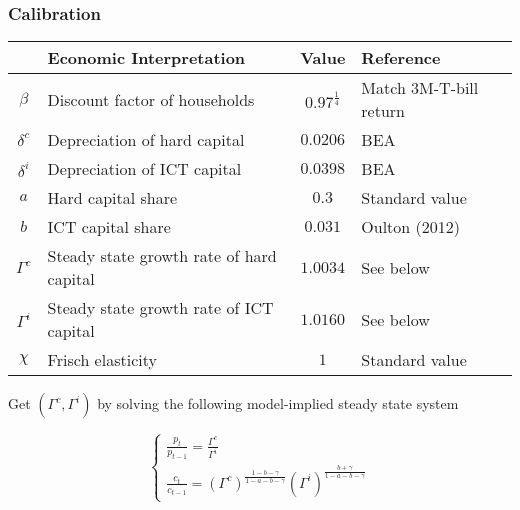 \documentclass{beamer}
\begin{document}
\begin{frame}
	\frametitle{Calibration}
	\label{calibration}

\begin{table}[h!]
\footnotesize
	\begin{center}
		\begin{tabular}{clcl}
			\hline
			 & Economic Interpretation &  Value & Reference\\
			\hline
            $\beta$ & Discount factor of households &   $0.97^{\frac{1}{4}}$ & Match 3M-T-bill return \\
            $\delta^c$     & Depreciation of hard capital & $0.0206$  & BEA\\
            $\delta^i$           & Depreciation of ICT capital &  $0.0398$ & BEA \\
            $a$           & Hard capital share & $0.3$  & Standard value\ \\
            $b$           & ICT capital share &  $0.031$ & Oulton (2012) \\
            $\Gamma^c$           & Steady state growth rate of hard capital &  $1.0034$ & See below   \\
            $\Gamma^i$           & Steady state growth rate of ICT capital &  $1.0160$ & See below\\
            $\chi$           & Frisch elasticity &  $1$ & Standard value \\ 
			\hline
		\end{tabular}
		\label{table:estimated_parameters}
	\end{center}
\end{table}	


Get $(\Gamma^c, \Gamma^i)$ by solving the following model-implied steady state system

\begin{equation}\label{equation:system_param}
\begin{cases}
 \frac{p_t}{p_{t-1}}  = \frac{\Gamma^c}{\Gamma^i} \\
 \frac{c_t}{c_{t-1}}  = (\Gamma^c)^{\frac{1-b-\gamma}{1-a-b-\gamma}}  (\Gamma^i)^{\frac{b+\gamma}{1-a-b-\gamma}}
\end{cases}
\end{equation}


\hyperlink{IRmatching}{}	


\end{frame}
\end{document}
